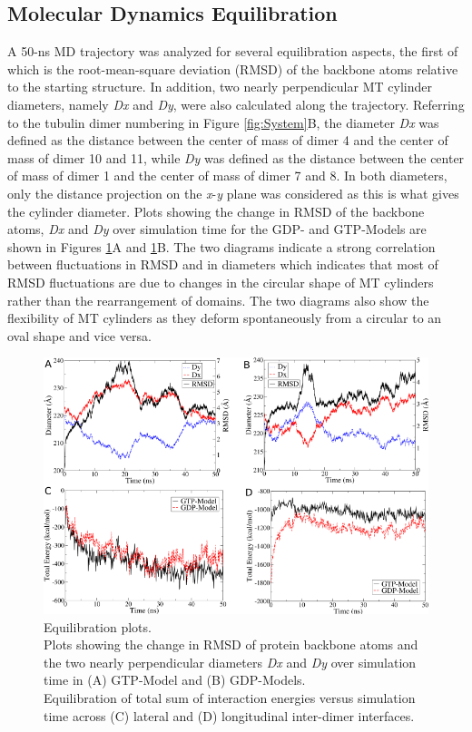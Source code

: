 \documentclass[11pt]{report}
\begin{document}
\subsection{Molecular Dynamics Equilibration}
A 50-ns MD trajectory was analyzed for several
equilibration aspects, the first of which is
the root-mean-square deviation (RMSD) of the backbone atoms relative to the starting
structure. In addition, two nearly perpendicular
MT cylinder diameters, namely \emph{Dx} and \emph{Dy}, were also calculated  along the trajectory. Referring 
to the tubulin dimer numbering in Figure \ref{fig:System}B, 
the diameter \emph{Dx} was defined as
the distance between the center of mass of dimer 4
and the center of mass of dimer 10 and 11, while \emph{Dy} 
was defined as the distance between the 
center of mass of dimer 1 and the center of mass of dimer 7 and 8. 
In both diameters, only the distance
projection on the \emph{x}-\emph{y} plane was considered
as this is what gives the cylinder diameter. 
Plots showing the change in RMSD of the backbone atoms,
\emph{Dx} and \emph{Dy} over simulation time for the
GDP- and GTP-Models are shown in Figures \ref{fig:Diam}A and \ref{fig:Diam}B.
The two diagrams indicate a strong correlation between fluctuations
in RMSD and in diameters which indicates that most of 
RMSD fluctuations are due to changes in the circular shape
of MT cylinders rather than the rearrangement of domains.
The two diagrams also show the flexibility of MT cylinders as they deform
spontaneously from a circular to an oval shape and vice versa. 
\begin{figure}[h]
  \centering 
  \includegraphics[width=0.9\linewidth]{images/Fig2.pdf}
  \caption[Equilibration Plots]{{Equilibration plots.}
    \\
    Plots showing the change in RMSD
    of protein backbone atoms and the two nearly
    perpendicular diameters \emph{Dx} and \emph{Dy} over simulation
    time in (A) GTP-Model and (B) GDP-Models.
    \\
    Equilibration of total sum of interaction energies versus simulation time across
    (C) lateral and (D) longitudinal inter-dimer interfaces.}
  \label{fig:Diam}
\end{figure}
\end{document}
